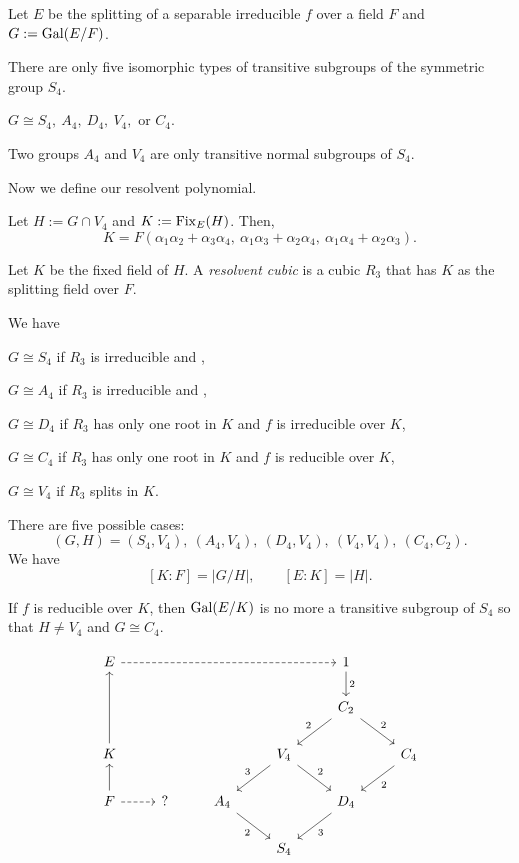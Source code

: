 \documentclass{../../large}
\begin{document}
Let $E$ be the splitting of a separable irreducible $f$ over a field $F$ and $G:=\operatorname{Gal}(E/F)$.

\begin{thm}
There are only five isomorphic types of transitive subgroups of the symmetric group $S_4$.
\end{thm}
\begin{cor}
$G\cong S_4,\ A_4,\ D_4,\ V_4,\text{ or }C_4$.
\end{cor}
\begin{prop}
Two groups $A_4$ and $V_4$ are only transitive normal subgroups of $S_4$.
\end{prop}

Now we define our resolvent polynomial.
\begin{prop}
Let $H:=G\cap V_4$ and $K:=\operatorname{Fix}_E(H)$.
Then,
\[K=F(\alpha_1\alpha_2+\alpha_3\alpha_4,\ \alpha_1\alpha_3+\alpha_2\alpha_4,\ \alpha_1\alpha_4+\alpha_2\alpha_3).\]
\end{prop}
\begin{defn}
Let $K$ be the fixed field of $H$.
A \emph{resolvent cubic} is a cubic $R_3$ that has $K$ as the splitting field over $F$.
\end{defn}

\begin{thm}
We have
\begin{parts}
\item $G\cong S_4$ if $R_3$ is irreducible and ,
\item $G\cong A_4$ if $R_3$ is irreducible and ,
\item $G\cong D_4$ if $R_3$ has only one root in $K$ and $f$ is irreducible over $K$,
\item $G\cong C_4$ if $R_3$ has only one root in $K$ and $f$ is reducible over $K$,
\item $G\cong V_4$ if $R_3$ splits in $K$.
\end{parts}
\end{thm}
\begin{pf}
There are five possible cases:
\[(G,H)=(S_4,V_4),\ (A_4,V_4),\ (D_4,V_4),\ (V_4,V_4),\ (C_4,C_2).\]
We have
\[[K:F]=|G/H|,\qquad[E:K]=|H|.\]

If $f$ is reducible over $K$, then $\operatorname{Gal}(E/K)$ is no more a transitive subgroup of $S_4$ so that $H\ne V_4$ and $G\cong C_4$.
\end{pf}
\[\begin{tikzcd}
E \ar[rrrr,dashed] &&&& 1 \dar{2} &\\
&&&& C_2 \dlar[swap]{2}\drar{2}&\\
K\ar[uu] &&& V_4 \dlar[swap]{3}\drar{2} && C_4 \dlar{2}\\
F \uar\rar[dashed]& ? & A_4 \drar[swap]{2} && D_4 \dlar{3} &\\
&&&S_4&&
\end{tikzcd}\]
\end{document}
